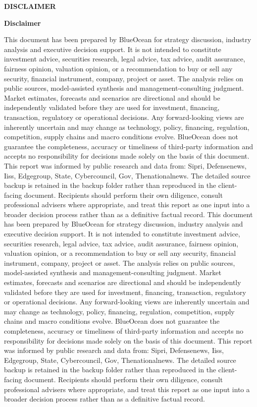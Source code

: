 \documentclass[10pt,a4paper]{article}
\begin{document}
\clearpage
{\textcolor{BOBlue}{\scriptsize\bfseries DISCLAIMER}}\par\vspace{3pt}
{\Large\sffamily\bfseries\color{BONavy} Disclaimer}\par\vspace{4pt}
\vspace{2pt}{\color{BOBright}\rule{\linewidth}{1pt}}\vspace{5pt}
{\footnotesize\color{BOMuted} This document has been prepared by BlueOcean for strategy discussion, industry analysis and executive decision support. It is not intended to constitute investment advice, securities research, legal advice, tax advice, audit assurance, fairness opinion, valuation opinion, or a recommendation to buy or sell any security, financial instrument, company, project or asset. The analysis relies on public sources, model-assisted synthesis and management-consulting judgment. Market estimates, forecasts and scenarios are directional and should be independently validated before they are used for investment, financing, transaction, regulatory or operational decisions. Any forward-looking views are inherently uncertain and may change as technology, policy, financing, regulation, competition, supply chains and macro conditions evolve. BlueOcean does not guarantee the completeness, accuracy or timeliness of third-party information and accepts no responsibility for decisions made solely on the basis of this document. This report was informed by public research and data from: Sipri, Defensenews, Iiss, Edgegroup, State, Cybercouncil, Gov, Thenationalnews. The detailed source backup is retained in the backup folder rather than reproduced in the client-facing document. Recipients should perform their own diligence, consult professional advisers where appropriate, and treat this report as one input into a broader decision process rather than as a definitive factual record. This document has been prepared by BlueOcean for strategy discussion, industry analysis and executive decision support. It is not intended to constitute investment advice, securities research, legal advice, tax advice, audit assurance, fairness opinion, valuation opinion, or a recommendation to buy or sell any security, financial instrument, company, project or asset. The analysis relies on public sources, model-assisted synthesis and management-consulting judgment. Market estimates, forecasts and scenarios are directional and should be independently validated before they are used for investment, financing, transaction, regulatory or operational decisions. Any forward-looking views are inherently uncertain and may change as technology, policy, financing, regulation, competition, supply chains and macro conditions evolve. BlueOcean does not guarantee the completeness, accuracy or timeliness of third-party information and accepts no responsibility for decisions made solely on the basis of this document. This report was informed by public research and data from: Sipri, Defensenews, Iiss, Edgegroup, State, Cybercouncil, Gov, Thenationalnews. The detailed source backup is retained in the backup folder rather than reproduced in the client-facing document. Recipients should perform their own diligence, consult professional advisers where appropriate, and treat this report as one input into a broader decision process rather than as a definitive factual record.}
\end{document}
